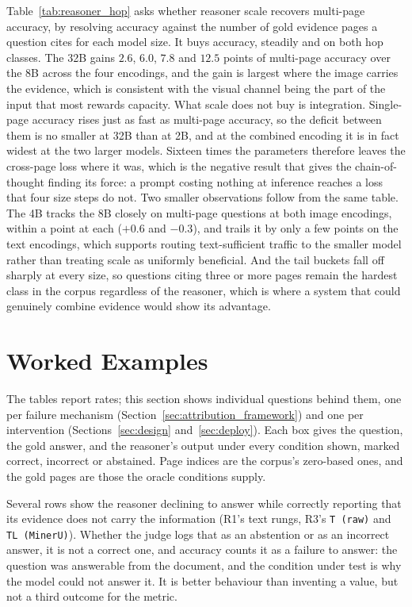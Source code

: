 Table~\ref{tab:reasoner_hop} asks whether reasoner scale recovers multi-page accuracy, by resolving accuracy against the number of gold evidence pages a question cites for each model size. It buys accuracy, steadily and on both hop classes. The 32B gains $2.6$, $6.0$, $7.8$ and $12.5$ points of multi-page accuracy over the 8B across the four encodings, and the gain is largest where the image carries the evidence, which is consistent with the visual channel being the part of the input that most rewards capacity. What scale does not buy is integration. Single-page accuracy rises just as fast as multi-page accuracy, so the deficit between them is no smaller at 32B than at 2B, and at the combined encoding it is in fact widest at the two larger models. Sixteen times the parameters therefore leaves the cross-page loss where it was, which is the negative result that gives the chain-of-thought finding its force: a prompt costing nothing at inference reaches a loss that four size steps do not. Two smaller observations follow from the same table. The 4B tracks the 8B closely on multi-page questions at both image encodings, within a point at each ($+0.6$ and $-0.3$), and trails it by only a few points on the text encodings, which supports routing text-sufficient traffic to the smaller model rather than treating scale as uniformly beneficial. And the tail buckets fall off sharply at every size, so questions citing three or more pages remain the hardest class in the corpus regardless of the reasoner, which is where a system that could genuinely combine evidence would show its advantage.

\newpage



\section{Worked Examples}
\label{app:examples}

The tables report rates; this section shows individual questions behind them, one
per failure mechanism (Section~\ref{sec:attribution_framework}) and one per
intervention (Sections~\ref{sec:design} and~\ref{sec:deploy}). Each box gives the
question, the gold answer, and the reasoner's output under every condition shown,
marked \wxR{} correct, \wxW{} incorrect or \wxA{} abstained. Page indices are the
corpus's zero-based ones, and the gold pages are those the oracle conditions supply.

Several rows show the reasoner declining to answer while correctly reporting that
its evidence does not carry the information (R1's text rungs, R3's \texttt{T (raw)}
and \texttt{TL (MinerU)}). Whether the judge logs that as an abstention or as an
incorrect answer, it is not a correct one, and accuracy counts it as a failure to
answer: the question was answerable from the document, and the condition under test
is why the model could not answer it. It is better behaviour than inventing a value,
but not a third outcome for the metric.

